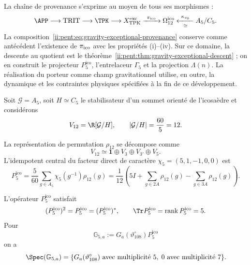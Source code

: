 La chaîne de provenance s’exprime au moyen de tous ses morphismes :
\begin{equation}
\label{ii:pent:eq:gravity-exceptional-provenance}
\APP\longrightarrow\mathrm{TRIT}\longrightarrow\TPK
\longrightarrow X_{\rm TPK}^{\rm exc}
\xrightarrow{\ \pi_{\rm ico}\ }\Omega_{12}^{\rm ico}
\xleftarrow[\simeq]{\ \kappa_{v_0}\ }A_5/C_5.
\end{equation}
La composition~\eqref{ii:pent:eq:gravity-exceptional-provenance} conserve
comme antécédent l’existence de \(\pi_{\rm ico}\) avec les propriétés
(i)--(iv). Sur ce domaine, la descente au quotient est le
théorème~\ref{ii:pent:thm:gravity-exceptional-descent} ; on en construit
le projecteur \(P^{\mathrm{ico}}_5\), l’entrelaceur \(\Gamma_5\) et la
projection \(\Lambda(n)\). La réalisation du porteur comme champ
gravitationnel utilise, en outre, la dynamique et les contraintes physiques
spécifiées à la fin de ce développement.

Soit \(\mathcal G=A_5\), soit \(H\simeq C_5\) le stabilisateur d’un sommet
orienté de l’icosaèdre et considérons
\begin{equation}
\label{ii:pent:eq:gravity-v12}
V_{12}=\R[\mathcal G/H],
\qquad |\mathcal G/H|=\frac{60}{5}=12.
\end{equation}


La représentation de permutation \(\rho_{12}\) se décompose comme
\begin{equation}
\label{ii:pent:eq:gravity-v12-decomposition}
V_{12}\simeq\mathbf1\oplus V_3\oplus V_{3'}\oplus V_5.
\end{equation}
L’idempotent central du facteur direct de caractère
\(\chi_5=(5,1,-1,0,0)\) est
\begin{equation}
\label{ii:pent:eq:gravity-p5}
\boxed{
P^{\mathrm{ico}}_5=\frac5{60}\sum_{g\in A_5}\chi_5(g^{-1})\rho_{12}(g)
=\frac1{12}\left(
5I+\sum_{g\in2A}\rho_{12}(g)
-\sum_{g\in3A}\rho_{12}(g)
\right).}
\end{equation}

\begin{theorem}
\label{ii:pent:thm:gravity-p5-coupling}
L'opérateur \(P^{\mathrm{ico}}_5\) satisfait
\begin{equation}
\label{ii:pent:eq:gravity-p5-properties}
(P^{\mathrm{ico}}_5)^2=P^{\mathrm{ico}}_5=(P^{\mathrm{ico}}_5)^*,
\qquad \Tr P^{\mathrm{ico}}_5=\operatorname{rank} P^{\mathrm{ico}}_5=5.
\end{equation}
Pour
\begin{equation}
\label{ii:pent:eq:gravity-G5}
\mathbb G_{5,a}:=G_a(\vartheta^\circ_{108})P^{\mathrm{ico}}_5
\end{equation}
on a
\begin{equation}
\label{ii:pent:eq:gravity-G5-spectrum}
\Spec(\mathbb G_{5,a})
=\{G_a(\vartheta^\circ_{108})\text{ avec multiplicité }5,
\;0\text{ avec multiplicité }7\}.
\end{equation}
\end{theorem}

